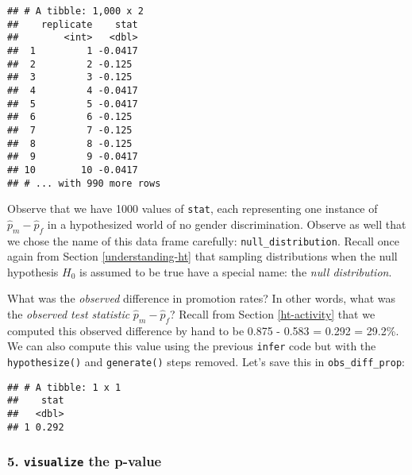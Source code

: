 \documentclass[
]{book}
\newenvironment{Shaded}{\begin{snugshade}}{\end{snugshade}}
\newcommand{\DataTypeTok}[1]{\textcolor[rgb]{0.13,0.29,0.53}{#1}}
\newcommand{\KeywordTok}[1]{\textcolor[rgb]{0.13,0.29,0.53}{\textbf{#1}}}
\newcommand{\NormalTok}[1]{#1}
\newcommand{\OperatorTok}[1]{\textcolor[rgb]{0.81,0.36,0.00}{\textbf{#1}}}
\newcommand{\StringTok}[1]{\textcolor[rgb]{0.31,0.60,0.02}{#1}}
\begin{document}
\begin{verbatim}
## # A tibble: 1,000 x 2
##    replicate    stat
##        <int>   <dbl>
##  1         1 -0.0417
##  2         2 -0.125 
##  3         3 -0.125 
##  4         4 -0.0417
##  5         5 -0.0417
##  6         6 -0.125 
##  7         7 -0.125 
##  8         8 -0.125 
##  9         9 -0.0417
## 10        10 -0.0417
## # ... with 990 more rows
\end{verbatim}

Observe that we have 1000 values of \texttt{stat}, each representing one instance of \(\widehat{p}_{m} - \widehat{p}_{f}\) in a hypothesized world of no gender discrimination. Observe as well that we chose the name of this data frame carefully: \texttt{null\_distribution}. Recall once again from Section \ref{understanding-ht} that sampling distributions when the null hypothesis \(H_0\) is assumed to be true have a special name: the \emph{null distribution}.

What was the \emph{observed} difference in promotion rates? In other words, what was the \emph{observed test statistic} \(\widehat{p}_{m} - \widehat{p}_{f}\)? Recall from Section \ref{ht-activity} that we computed this observed difference by hand to be 0.875 - 0.583 = 0.292 = 29.2\%. We can also compute this value using the previous \texttt{infer} code but with the \texttt{hypothesize()} and \texttt{generate()} steps removed. Let's save this in \texttt{obs\_diff\_prop}:

\begin{Shaded}
\end{Shaded}

\begin{verbatim}
## # A tibble: 1 x 1
##    stat
##   <dbl>
## 1 0.292
\end{verbatim}

\hypertarget{visualize-the-p-value}{%
\subsubsection*{\texorpdfstring{5. \texttt{visualize} the p-value}{5. visualize the p-value}}\label{visualize-the-p-value}}
\end{document}
